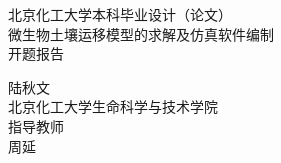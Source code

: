 \begin{titlepage}
\thispagestyle{empty}
\newcommand{\HRule}{\rule{\linewidth}{0.5mm}} %

\center %
 

\vspace*{1.2cm}
\textsc{ 北京化工大学本科毕业设计（论文）}\\[2.8cm] %


\vspace*{1.2cm}
{\heiti {}微生物土壤运移模型的求解及仿真软件编制 \biaosong{} \\ [0.8cm]开题报告}\\[1cm] %
\vspace*{1.2cm}
 

{\kaishu\large
陆秋文\\
北京化工大学生命科学与技术学院\\[0.5cm]}
指导教师\\
{\large\kaishu 周\quad 延}


\end{titlepage}
